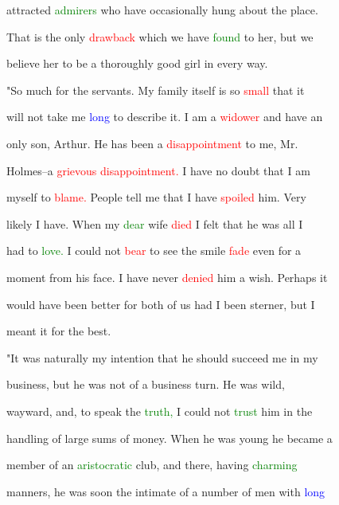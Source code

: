  attracted \textcolor{green}{admirers} who have occasionally hung about the place.

 That is the only \textcolor{red}{drawback} which we have \textcolor{green}{found} to her, but we

 believe her to be a thoroughly \textcolor{BurntOrange}{good} girl in every way.



 "So much for the \textcolor{BurntOrange}{servants.} My family itself is so \textcolor{red}{small} that it

 will not take me \textcolor{blue}{long} to describe it. I am a \textcolor{red}{widower} and have an

 only son, Arthur. He has been a \textcolor{red}{disappointment} to me, Mr.

 Holmes--a \textcolor{red}{grievous} \textcolor{red}{disappointment.} I have no \textcolor{BurntOrange}{doubt} that I am

 myself to \textcolor{red}{blame.} People tell me that I have \textcolor{red}{spoiled} him. Very

 likely I have. When my \textcolor{green}{dear} wife \textcolor{red}{died} I felt that he was all I

 had to \textcolor{green}{love.} I could not \textcolor{red}{bear} to see the \textcolor{BurntOrange}{smile} \textcolor{red}{fade} even for a

 moment from his face. I have never \textcolor{red}{denied} him a wish. Perhaps it

 would have been better for both of us had I been sterner, but I

 meant it for the best.



 "It was naturally my intention that he should \textcolor{BurntOrange}{succeed} me in my

 business, but he was not of a business turn. He was \textcolor{BurntOrange}{wild,}

 wayward, and, to speak the \textcolor{green}{truth,} I could not \textcolor{green}{trust} him in the

 handling of large sums of \textcolor{BurntOrange}{money.} When he was \textcolor{BurntOrange}{young} he became a

 member of an \textcolor{green}{aristocratic} club, and there, having \textcolor{green}{charming}

 manners, he was soon the \textcolor{BurntOrange}{intimate} of a number of men with \textcolor{blue}{long}

